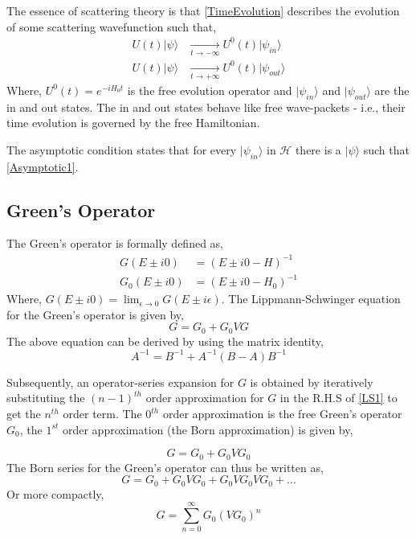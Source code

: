 \documentclass[a4paper,10pt]{report}
\begin{document}
The essence of scattering theory is that \eqref{TimeEvolution} describes the evolution of some scattering wavefunction such that,
\begin{align}\label{Asymptotic1}
 U(t)|\psi\rangle &\displaystyle\xrightarrow[t\rightarrow-\infty]{}  U^0(t)|\psi_{in}\rangle\\
 U(t)|\psi\rangle &\displaystyle\xrightarrow[t\rightarrow+\infty]{}  U^0(t)|\psi_{out}\rangle
\end{align}
Where, $U^0(t)=e^{-iH_0t}$ is the free evolution operator and $|\psi_{in}\rangle$ and $|\psi_{out}\rangle$ are the in and out
states. The in and out states behave like free wave-packets - i.e., their time evolution is governed by the free Hamiltonian.

The asymptotic condition states that for every $|\psi_{in}\rangle$ in $\mathcal{H}$ there is a $|\psi\rangle$ such that 
\eqref{Asymptotic1}.

\subsection{Green's Operator}
The Green's operator is formally defined as,
\begin{align}\label{GFdefinition}
 G\left(E\pm i0\right) &=\left(E\pm i0-H\right)^{-1}\\
 G_0\left(E\pm i0\right) &=\left(E\pm i0-H_0\right)^{-1}
\end{align}
Where, $G\left(E\pm i0\right)=\displaystyle\lim_{\epsilon\rightarrow 0}G(E\pm i\epsilon)$. The
Lippmann-Schwinger equation for the Green's operator is given by,
\begin{equation}\label{LS1}
 G=G_0+G_0VG
\end{equation}
 The above equation can be derived by using the matrix identity,
\begin{equation}\label{MatrixIdentity1}
	A^{-1}=B^{-1}+A^{-1}\left(B-A\right)B^{-1}
\end{equation}

Subsequently, an operator-series expansion for $G$ is obtained by iteratively substituting
the $(n-1)^{th}$ order approximation for $G$ in the R.H.S of \eqref{LS1} to get the $n^{th}$
order term. The $0^{th}$ order approximation is the free Green's operator $G_0$, the $1^{st}$
order approximation (the Born approximation) is given by,

\begin{equation}\label{BornApproximation}
 G=G_0+G_0VG_0
\end{equation}
The Born series for the Green's operator can thus be written as,
\begin{equation}\label{BornSeriesExpanded}
 G=G_0+G_0VG_0+G_0VG_0VG_0+\ldots
\end{equation}
Or more compactly,
\begin{equation}\label{BornSeriesCompact}
 G=\displaystyle\sum_{n=0}^{\infty}G_0\left(VG_0\right)^n
\end{equation}
\end{document}
